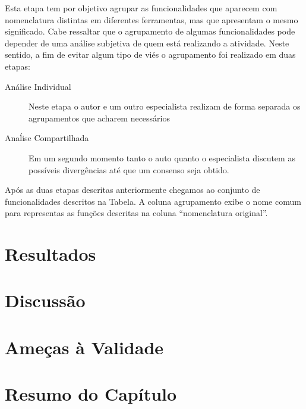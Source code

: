 Esta etapa tem por objetivo agrupar as funcionalidades que aparecem com
nomenclatura distintas em diferentes ferramentas, mas que apresentam o mesmo
significado. Cabe ressaltar que o agrupamento de algumas funcionalidades pode
depender de uma análise subjetiva de quem está realizando a atividade.  Neste
sentido, a fim de evitar algum tipo de viés o agrupamento foi realizado em duas
etapas:

\begin{description}
	\item[Análise Individual] Neste etapa o autor e um outro especialista
		realizam de forma separada os agrupamentos que acharem necessários
	\item[Anaĺise Compartilhada] Em um segundo momento tanto o auto quanto o
		especialista discutem as possíveis divergências até que um consenso seja
		obtido.
\end{description}

Após as duas etapas descritas anteriormente chegamos ao conjunto de
funcionalidades descritos na Tabela. A coluna agrupamento exibe o nome comum
para representas as funções descritas na coluna ``nomenclatura original''.



\section{Resultados}
\label{sec:resultados}



\section{Discussão}
\label{sec:discussao}

\section{Ameças à Validade}
\label{sec:ameacas_a_validade}


\section{Resumo do Capítulo}
\label{sec:resumo_do_capitulo}